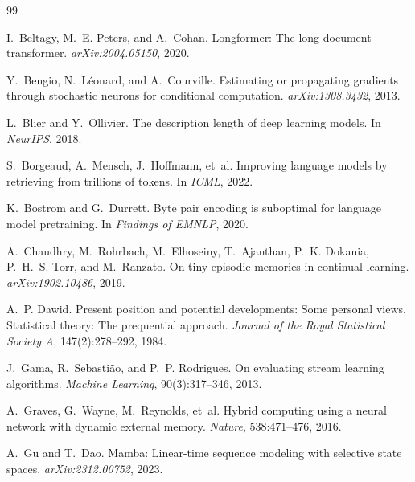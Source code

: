 \documentclass[11pt,a4paper]{article}
\begin{document}
\begin{thebibliography}{99}

I.~Beltagy, M.~E. Peters, and A.~Cohan.
\newblock Longformer: The long-document transformer.
\newblock \emph{arXiv:2004.05150}, 2020.

Y.~Bengio, N.~L\'{e}onard, and A.~Courville.
\newblock Estimating or propagating gradients through stochastic neurons for
conditional computation.
\newblock \emph{arXiv:1308.3432}, 2013.

L.~Blier and Y.~Ollivier.
\newblock The description length of deep learning models.
\newblock In \emph{NeurIPS}, 2018.

S.~Borgeaud, A.~Mensch, J.~Hoffmann, et~al.
\newblock Improving language models by retrieving from trillions of tokens.
\newblock In \emph{ICML}, 2022.

K.~Bostrom and G.~Durrett.
\newblock Byte pair encoding is suboptimal for language model pretraining.
\newblock In \emph{Findings of EMNLP}, 2020.

A.~Chaudhry, M.~Rohrbach, M.~Elhoseiny, T.~Ajanthan, P.~K. Dokania, P.~H.~S.
Torr, and M.~Ranzato.
\newblock On tiny episodic memories in continual learning.
\newblock \emph{arXiv:1902.10486}, 2019.

A.~P. Dawid.
\newblock Present position and potential developments: Some personal views.
Statistical theory: The prequential approach.
\newblock \emph{Journal of the Royal Statistical Society A}, 147(2):278--292,
1984.

J.~Gama, R.~Sebasti\~{a}o, and P.~P. Rodrigues.
\newblock On evaluating stream learning algorithms.
\newblock \emph{Machine Learning}, 90(3):317--346, 2013.

A.~Graves, G.~Wayne, M.~Reynolds, et~al.
\newblock Hybrid computing using a neural network with dynamic external memory.
\newblock \emph{Nature}, 538:471--476, 2016.

A.~Gu and T.~Dao.
\newblock Mamba: Linear-time sequence modeling with selective state spaces.
\newblock \emph{arXiv:2312.00752}, 2023.


\end{thebibliography}
\end{document}
